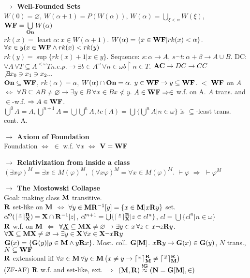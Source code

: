 \documentclass[9pt]{article}
\newcommand{\class}[1]{{\bf #1}}
\newcommand{\mytitle}[1]{ {\bf $\rightarrow$ #1}\\}
\newcommand{\On}{\class{On}}
\newcommand{\V}{\class{V}}
\newcommand{\M}{\class{M}}
\newcommand{\Rr}{\class{R}}
\newcommand{\WF}{\class{WF}}
\newcommand{\X}{\class{X}}
\begin{document}
\begin{multicols*}{2}
\mytitle{Well-Founded Sets}
$W(0)=\varnothing$, $W(\alpha+1)=P(W(\alpha))$, $W(\alpha)=\bigcup\limits_{\xi<\alpha}W(\xi)$, $\WF=\bigcup\limits_{\On}W(\alpha)$\\
$rk(x)=$ least $\alpha\colon x\in W(\alpha+1)$. $W(\alpha)=\{x\in \WF|rk(x)<\alpha\}$. $\forall x\in y (x\in \WF\wedge rk(x)<rk(y)$\\
$rk(y)=\sup\{rk(x)+1|x\in y\}$. Sequence: $s\colon\alpha\to A$, $s^\smallfrown t\colon \alpha+\beta\to A\cup B$.
DC: $\forall A\,\forall T\subseteq A^{<\omega} T n.e.p. \to \exists b\in A^\omega \,\forall n\in\omega b\upharpoonright n\in T$. $\class{AC}\to DC\to CC$\\
$\not\exists x_0\ni x_1\ni x_2...$\\ $\On\subseteq \WF$, $rk(\alpha)=\alpha$, $W(\alpha)\cap \On=\alpha$. $y\in \WF\to y\subseteq \WF$. $<$ $\WF$ on $A$ $\Leftrightarrow$ $\forall B\subseteq A B\neq \varnothing\to\exists y\in B\,\forall x\in B x\nless y$. $A\in \WF\Rightarrow \in$ w.f. on A. $A$ trans. and $\in$-w.f. $\Rightarrow A\in \WF$.\\
$\bigcup^0A=A,\bigcup^{n+1}A=\bigcup\bigcup^{n}A,tc(A)=\bigcup\{\bigcup^n A|n\in\omega\}$ is $\subseteq$-least trans. cont. A.

\mytitle{Axiom of Foundation}
Foundation $\Leftrightarrow$ $\in$ w.f. $\forall x$ $\Leftrightarrow$ $\V=\WF$

\mytitle{Relativization from inside a class}
$(\exists x \varphi)^M=\exists x\in M(\varphi)^M$, $(\forall x \varphi)^M=\forall x\in M(\varphi)^M$. $\vdash\varphi$ $\Rightarrow$ $\vdash\varphi^M$

\mytitle{The Mostowski Collapse}
Goal: making class $\class{M}$ transitive.\\
$\class{R}$ set-like on $\class{M}$ $\Leftrightarrow$ $\forall y\in \class{M} \class{R}^{-1}[y]=\{x\in \class{M}|x\class{R}y\}$ set.\\
$cl^0(\lceil\frac{x}{}\rceil^\Rr_\X)=\X\cap \Rr^{-1}[z]$, $cl^{n+1}=\bigcup\{\lceil\frac{z}{}\rceil^\Rr_\X|z\in cl^n\}$, $cl=\bigcup \{cl^n|n\in\omega\}$\\
$\Rr$ w.f. on $\class{M}$ $\Leftrightarrow$ $\forall \underline{X}\subseteq \M \X\neq\varnothing\to\exists y\in x\,\forall z\in x \neg z\Rr y$.
$\forall\class{X}\subseteq\class{M} \class{X}\neq\varnothing\to\exists y\in\class{X}\,\forall x\in\class{X}\neg x\Rr y$\\
$\class{G}(x)=\{\class{G}(y)|y\in\class{M}\wedge y\class{R}x\}$. Most. coll. $\class{G}[\class{M}]$. $x\class{R}y\to \class{G}(x)\in\class{G}(y)$, $N$ trans., $N\subseteq \WF$\\
$\Rr$ extensional iff $\forall x\in\M\,\forall y\in\M\left(x\neq y\to \lceil\frac{x}{}\rceil^\Rr_\M \neq\lceil\frac{y}{}\rceil_\M^\Rr\right)$\\
(ZF-AF) $\Rr$ w.f. and set-like, ext. $\Rightarrow$ $(\M,\Rr)\overset{!\class{G}}{\approx}(\class{N}=\class{G}[\M],\in)$\\


\end{multicols*}
\end{document}
